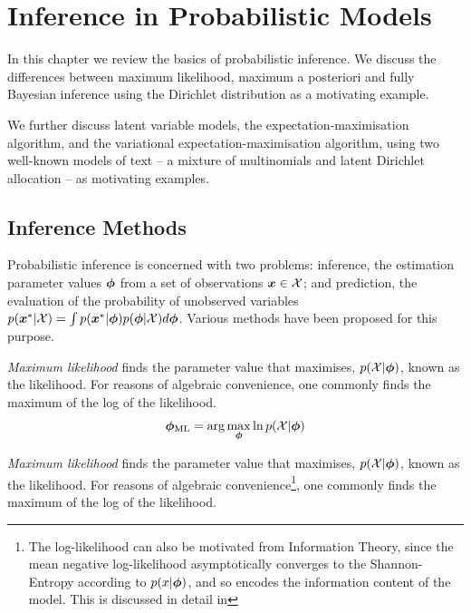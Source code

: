 

\newcommand \zd   { { \vv{z}_d } }
\newcommand \qfam { { \mathcal{Q} } }
\newcommand \xdat { { \mathcal{X} } }
\newcommand \zdat { { \mathcal{Z} } }
\newcommand \xnew { { \vv{x}^{*} } }
\newcommand \znew { { \vv{z}^{*} } }
\newcommand \param { { \vv{\phi} } }
\newcommand \params { { \Phi } }
\newcommand \ml[1] { { {#1}_{\text{ML}} } } 
\newcommand \map[1] { { {#1}_{\text{MAP}} } } 
\newcommand \quarter { { \oneover{4} } }
\newcommand \eighth { { \oneover{8} } }
\newcommand \fqt[1] { { \mathcal{F}\left( {#1} \right) } }
\newcommand \joint { { p(\xdat, \zdat | \params) } }
\newcommand \logjoint { { \ln \joint } }
\newcommand \exlogjoint[1] { { \ex{\logjoint}{{#1}} } }

\chapter{Inference in Probabilistic Models}
In this chapter we review the basics of probabilistic inference. We discuss the differences between maximum likelihood, maximum a posteriori and fully Bayesian inference using the Dirichlet distribution as a motivating example.

We further discuss latent variable models, the expectation-maximisation algorithm, and the variational expectation-maximisation algorithm, using two well-known models of text -- a mixture of multinomials and latent Dirichlet allocation -- as motivating examples.
 \section{Inference Methods}

Probabilistic inference is concerned with two problems: inference, the estimation parameter values $\param$ from a set of observations $\vv{x} \in \xdat$; and prediction, the evaluation of the probability of unobserved variables $p(\xnew | \xdat) = \int p(\xnew | \param) p(\param | \xdat) d\param$. Various methods have been proposed for this purpose.

\emph{Maximum likelihood} finds the parameter value that maximises, $p(\xdat|\param)$, known as the likelihood. For reasons of algebraic convenience, one commonly finds the maximum of the log of the likelihood.\begin{align}
\ml{\param} = \arg \max_{\param} \ln p(\xdat | \param)
\end{align}

\emph{Maximum likelihood} finds the parameter value that maximises, $p(\xdat|\param)$, known as the likelihood. For reasons of algebraic convenience\footnote{The log-likelihood can also be motivated from Information Theory, since the mean negative log-likelihood asymptotically converges to the Shannon-Entropy according to $p(x|\param)$, and so encodes the information content of the model. This is discussed in detail in  }, one commonly finds the maximum of the log of the likelihood.


